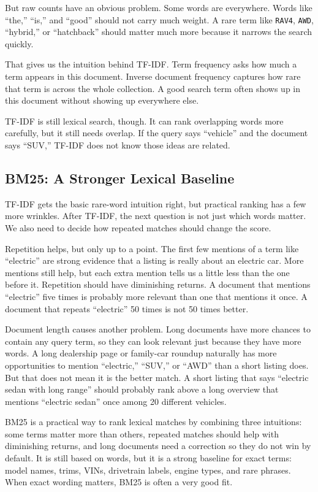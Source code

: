 \documentclass[12pt]{article}
\begin{document}
But raw counts have an obvious problem. Some words are everywhere. Words
like ``the,'' ``is,'' and ``good'' should not carry much weight. A rare
term like \texttt{RAV4}, \texttt{AWD}, ``hybrid,'' or ``hatchback'' should
matter much more because it narrows the search quickly.

That gives us the intuition behind TF-IDF. Term frequency asks how much a
term appears in this document. Inverse document frequency captures how
rare that term is across the whole collection. A good search term often
shows up in this document without showing up everywhere else.

TF-IDF is still lexical search, though. It can rank overlapping words more
carefully, but it still needs overlap. If the query says ``vehicle'' and
the document says ``SUV,'' TF-IDF does not know those ideas are related.

\subsection{BM25: A Stronger Lexical Baseline}

TF-IDF gets the basic rare-word intuition right, but practical ranking has
a few more wrinkles. After TF-IDF, the next question is not just which
words matter. We also need to decide how repeated matches should change
the score.

Repetition helps, but only up to a point. The first few mentions of a term
like ``electric'' are strong evidence that a listing is really about an
electric car. More mentions still help, but each extra mention tells us a
little less than the one before it. Repetition should have diminishing
returns. A document that mentions ``electric'' five times is probably more
relevant than one that mentions it once. A document that repeats
``electric'' 50 times is not 50 times better.

Document length causes another problem. Long documents have more chances
to contain any query term, so they can look relevant just because they
have more words. A long dealership page or family-car roundup naturally
has more opportunities to mention ``electric,'' ``SUV,'' or ``AWD'' than a
short listing does. But that does not mean it is the better match. A short
listing that says ``electric sedan with long range'' should probably rank
above a long overview that mentions ``electric sedan'' once among 20
different vehicles.

BM25 is a practical way to rank lexical matches by combining three
intuitions: some terms matter more than others, repeated matches should
help with diminishing returns, and long documents need a correction so
they do not win by default. It is still based on words, but it is a strong
baseline for exact terms: model names, trims, VINs, drivetrain labels,
engine types, and rare phrases. When exact wording matters, BM25 is often
a very good fit.
\end{document}
